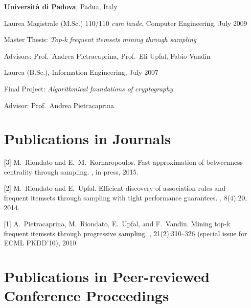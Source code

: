 \documentclass[margin,line]{resume}
\begin{document}
\begin{resume}
{\bf Universit\`a di Padova}, Padua, Italy\\
\vspace*{-.18in}
\begin{list1}
\item[] Laurea Magistrale (M.Sc.) 110/110 \textit{cum laude}, Computer Engineering, July 2009
\begin{list2}
\item Master Thesis: {\em Top-k frequent itemsets mining through sampling}
\item Advisors: Prof.~Andrea Pietracaprina, Prof.~Eli Upfal, Fabio Vandin
\end{list2}
\item[] Laurea (B.Sc.), Information Engineering, July 2007
\begin{list2}
\item Final Project: {\em Algorithmical foundations of cryptography}
\item Advisor: Prof.~Andrea Pietracaprina
\end{list2}
\end{list1}
\end{resume}

\section{\sc Publications in Journals}

[3] M.~Riondato and E.~M.~Kornaropoulos.
\newblock Fast approximation of betweenness centrality through sampling.
, in press, 2015.

[2] M.~Riondato and E.~Upfal.
\newblock Efficient discovery of association rules and frequent itemsets through
sampling with tight performance guarantees.
, 8(4):20, 2014.

[1] A.~Pietracaprina, M.~Riondato, E.~Upfal, and F.~Vandin.
\newblock Mining top-k frequent itemsets through progressive sampling.
, 21(2):310--326 (special issue for
ECML PKDD'10), 2010.

\section{\sc Publications in Peer-reviewed Conference Proceedings}
\end{document}
